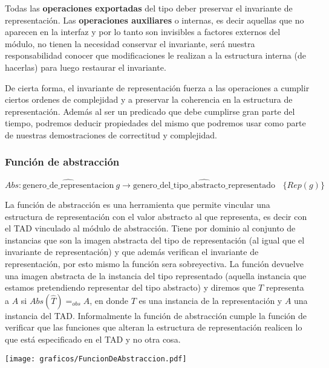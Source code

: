 Todas las \textbf{operaciones exportadas} del tipo deber preservar el invariante de representaci\'on. Las \textbf{operaciones auxiliares} o internas, es decir aquellas que no aparecen en la interfaz y por lo tanto son invisibles a factores externos del m\'odulo, no tienen la necesidad conservar el invariante, ser\'a nuestra responsabilidad conocer que modificaciones le realizan a la estructura interna (de hacerlas) para luego restaurar el invariante.

De cierta forma, el invariante de representaci\'on fuerza a las operaciones a cumplir ciertos ordenes de complejidad y a preservar la coherencia en la estructura de representaci\'on. Adem\'as al ser un predicado que debe cumplirse gran parte del tiempo, podremos deducir propiedades del mismo que podremos usar como parte de nuestras demostraciones de correctitud y complejidad.

\subsubsection{Funci\'on de abstracci\'on}

\begin{equation*}
 Abs: \widehat{\text{genero\_de\_representacion}}\ g \rightarrow \widehat{\text{genero\_del\_tipo\_abstracto\_representado}} \ \ \ \ \{Rep(g)\}
\end{equation*}

La funci\'on de abstracci\'on es una herramienta que permite vincular una estructura de representaci\'on con el valor abstracto al que representa, es decir con el TAD vinculado al m\'odulo de abstracci\'on. Tiene por dominio al conjunto de instancias que son la imagen abstracta del tipo de representaci\'on (al igual que el invariante de representaci\'on) y que adem\'as verifican el invariante de representaci\'on, por esto mismo la funci\'on sera sobreyectiva. La funci\'on devuelve una imagen abstracta de la instancia del tipo representado (aquella instancia que estamos pretendiendo representar del tipo abstracto) y diremos que $T$ representa a $A$ si $Abs(\widehat{T})=_{obs} A$, en donde $T$ es una instancia de la representaci\'on y $A$ una instancia del TAD. Informalmente la funci\'on de abstracci\'on cumple la funci\'on de verificar que las funciones que alteran la estructura de representaci\'on realicen lo que est\'a especificado en el TAD y no otra cosa.

\begin{SCfigure}[1][ht!]
 \centering
 \texttt{[image: graficos/FuncionDeAbstraccion.pdf]}
 \caption*{\footnotesize $A$ ser\'a el modulo en cuesti\'on que estaremos dise\~nando y $B$ la estructura de representaci\'on del mismo. El circulo con el punto dentro hace alusi\'on al hecho de que la conmutaci\'on del triangulo conserva la sanidad. Esto significa que la aplicaci\'on de la funci\'on de abstracci\'on a $B$ deber\'a dar el mismo resultado que la aplicaci\'on de $\widehat{\text{\textbullet}}$ a $A$.
 \newline
 \newline }
\end{SCfigure}

